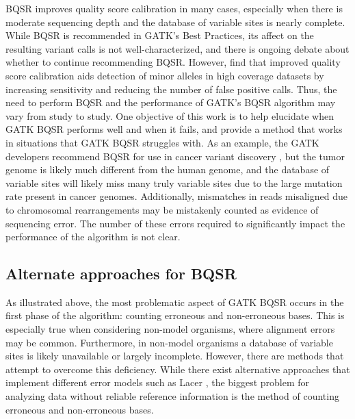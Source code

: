 BQSR improves quality score calibration in many cases, especially when there is moderate sequencing depth and the database of variable sites is nearly complete. %
While BQSR is recommended in GATK's Best Practices, its affect on the resulting variant calls is not well-characterized, and there is ongoing debate about whether to continue recommending BQSR. \parencite{van_der_auwera_geraldine_2020, van_der_auwera_geraldine_2020_b}
However, \cite{ni_improvement_2016} find that improved quality score calibration aids detection of minor alleles in high coverage datasets by increasing sensitivity and reducing the number of false positive calls.
Thus, the need to perform BQSR and the performance of GATK's BQSR algorithm may vary from study to study.
One objective of this work is to help elucidate when GATK BQSR performs well and when it fails, and provide a method that works in situations that GATK BQSR struggles with.
As an example, the GATK developers recommend BQSR for use in cancer variant discovery \parencite{cibulskis_sensitive_2013}, but the tumor genome is likely much different from the human genome, and the database of variable sites will likely miss many truly variable sites due to the large mutation rate present in cancer genomes. Additionally, mismatches in reads misaligned due to chromosomal rearrangements may be mistakenly counted as evidence of sequencing error. The number of these errors required to significantly impact the performance of the algorithm is not clear.

\subsection{Alternate approaches for BQSR}
As illustrated above, the most problematic aspect of GATK BQSR occurs in the first phase of the algorithm: counting erroneous and non-erroneous bases. This is especially true when considering non-model organisms, where alignment errors may be common. Furthermore, in non-model organisms a database of variable sites is likely unavailable or largely incomplete. However, there are methods that attempt to overcome this deficiency. While there exist alternative approaches that implement different error models such as Lacer \parencite{chung_lacer:_2017}, the biggest problem for analyzing data without reliable reference information is the method of counting erroneous and non-erroneous bases.

